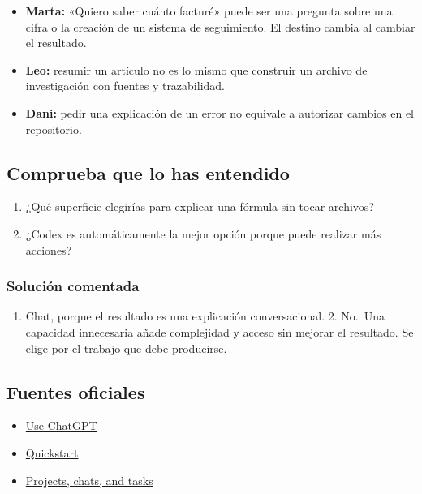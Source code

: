 \documentclass[10pt,a4paper,openany]{book}
\providecommand{\tightlist}{\setlength{\itemsep}{0.18em}\setlength{\parskip}{0pt}}
\begin{document}
\begin{itemize}
\tightlist
\item
  \textbf{Marta:} «Quiero saber cuánto facturé» puede ser una pregunta
  sobre una cifra o la creación de un sistema de seguimiento. El destino
  cambia al cambiar el resultado.
\item
  \textbf{Leo:} resumir un artículo no es lo mismo que construir un
  archivo de investigación con fuentes y trazabilidad.
\item
  \textbf{Dani:} pedir una explicación de un error no equivale a
  autorizar cambios en el repositorio.
\end{itemize}

\subsection{Comprueba que lo has
entendido}\label{comprueba-que-lo-has-entendido}

\begin{enumerate}
\def\labelenumi{\arabic{enumi}.}
\tightlist
\item
  ¿Qué superficie elegirías para explicar una fórmula sin tocar
  archivos?
\item
  ¿Codex es automáticamente la mejor opción porque puede realizar más
  acciones?
\end{enumerate}

\subsubsection{Solución comentada}\label{soluciuxf3n-comentada}

\begin{enumerate}
\def\labelenumi{\arabic{enumi}.}
\tightlist
\item
  Chat, porque el resultado es una explicación conversacional. 2.
  No.~Una capacidad innecesaria añade complejidad y acceso sin mejorar
  el resultado. Se elige por el trabajo que debe producirse.
\end{enumerate}

\subsection{Fuentes oficiales}\label{fuentes-oficiales}

\begin{itemize}
\tightlist
\item
  \href{https://learn.chatgpt.com/docs/use-chatgpt}{Use ChatGPT}
\item
  \href{https://learn.chatgpt.com/docs/quickstart}{Quickstart}
\item
  \href{https://learn.chatgpt.com/docs/projects}{Projects, chats, and
  tasks}
\end{itemize}
\end{document}
